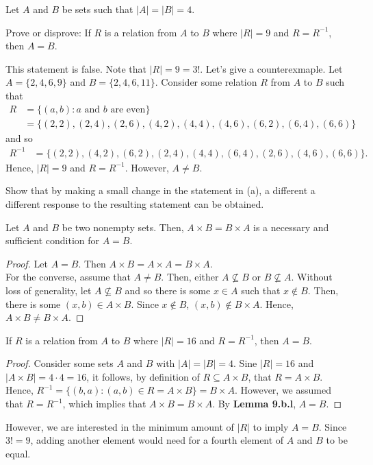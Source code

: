 \documentclass[12pt]{article}
\newenvironment{theorem}[2][Theorem]{\begin{trivlist}
		\item[\hskip \labelsep {\bfseries #1}\hskip \labelsep {\bfseries #2.}]}{\end{trivlist}}
\newenvironment{lemma}[2][Lemma]{\begin{trivlist}
		\item[\hskip \labelsep {\bfseries #1}\hskip \labelsep {\bfseries #2.}]}{\end{trivlist}}
\newenvironment{problem}[2][Problem]{\begin{trivlist}
		\item[\hskip \labelsep {\bfseries #1}\hskip \labelsep {\bfseries #2.}]}{\end{trivlist}}
\newenvironment{solution}[2][Solution]{\begin{trivlist}
		\item[\hskip \labelsep {\bfseries #1}\hskip \labelsep {\bfseries #2.}]}{\end{trivlist}}
\begin{document}
	\begin{problem}{9}
		Let $A$ and $B$ be sets such that $|A|=|B|=4$.
		\begin{enumerate}[label=(\alph*)]
			\item Prove or disprove: If $R$ is a relation from $A$ to $B$ where $|R| = 9$ and $R=R^{-1}$, then $A=B$.
			\begin{solution}{9}
				This statement is false. Note that $|R|=9=3!$. Let's give a counterexmaple. Let $A=\{2,4,6,9\}$ and $B=\{2,4,6,11\}$. Consider some relation $R$ from $A$ to $B$ such that 
				\begin{align*}
				 R &= \{(a,b):a\text{ and }b \text{ are even}\}\\
				 &=\{(2,2),(2,4),(2,6),(4,2),(4,4),(4,6),(6,2),(6,4),(6,6)\}
				\end{align*}
				and so
				\begin{align*}
				R^{-1} &= \{(2,2),(4,2),(6,2),(2,4),(4,4),(6,4),(2,6),(4,6),(6,6)\}.
				\end{align*}
				Hence, $|R|=9$ and $R=R^{-1}$. However, $A\neq B$.
			\end{solution}
			\item Show that by making a small change in the statement in (a), a different a different response to the resulting statement can be obtained.
			\begin{solution}{b}
				\begin{lemma}{9.b.l}
					Let $A$ and $B$ be two nonempty sets. Then, $A\times B = B\times A$ is a necessary and sufficient condition for $A=B$. 
					\begin{proof}
						Let $A=B$. Then $A\times B = A\times A = B\times A$. \\
						For the converse, assume that $A\neq B$. Then, either $A\not\subseteq B$ or $B\not\subseteq A$. Without loss of generality, let $A\not\subseteq B$ and so there is some $x\in A$ such that $x\not\in B$. Then, there is some $(x,b) \in A\times B$. Since $x\not\in B$, $(x,b) \not\in B\times A$. Hence, $A\times B \neq B\times A$.
					\end{proof}
				\end{lemma}
				\begin{theorem}{9.b}
					If $R$ is a relation from $A$ to $B$ where $|R| = 16$ and $R=R^{-1}$, then $A=B$.
					\begin{proof}
						Consider some sets $A$ and $B$ with $|A|=|B|=4$. Sine $|R| = 16$ and $|A\times B| = 4\cdot 4 = 16$, it follows, by definition of $R\subseteq A\times B$, that $R= A\times B$. Hence, $R^{-1}= \{(b,a):(a,b)\in R=A\times B\}=B\times A$. However, we assumed that $R = R^{-1}$, which implies that $A\times B = B\times A$. By \textbf{Lemma 9.b.l}, $A=B$.
					\end{proof}
				\end{theorem}
			
				However, we are interested in the minimum amount of $|R|$ to imply $A=B$. Since $3!=9$, adding another element would need for a fourth element of $A$ and $B$ to be equal.
			\end{solution}
		\end{enumerate} 
	\end{problem}
\end{document}
